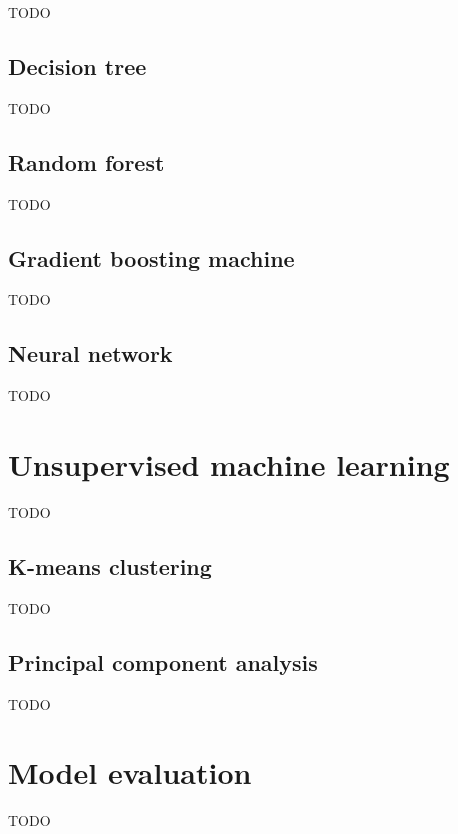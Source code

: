 \documentclass[12pt, a4paper]{report}
\theoremstyle{plain}
\theoremstyle{plain}
\theoremstyle{remark}
\begin{document}
TODO

\subsection{Decision tree}
\label{subsec:mlt_sml_decision_tree}

TODO

\subsection{Random forest}
\label{subsec:mlt_sml_random_forest}

TODO

\subsection{Gradient boosting machine}
\label{subsec:mlt_sml_gradient_boosting_machine}

TODO

\subsection{Neural network}
\label{subsec:mlt_sml_neural_network}

TODO

\section{Unsupervised machine learning}
\label{sec:mlt_unsupervised_machine_learning}

TODO

\subsection{K-means clustering}
\label{subsec:mlt_uml_k_means_clustering}

TODO

\subsection{Principal component analysis}
\label{subsec:mlt_uml_principal_component_analysis}

TODO

\section{Model evaluation}
\label{sec:mlt_model_evaluation}

TODO
\end{document}
